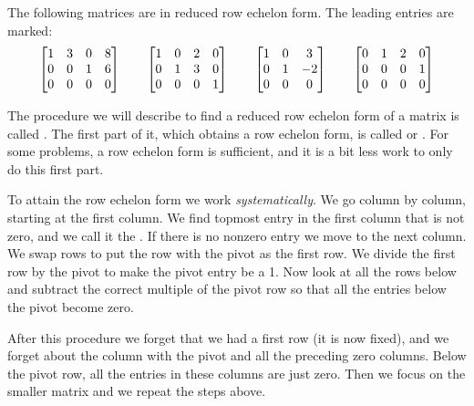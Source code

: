 \documentclass{ximera}
\begin{document}
\begin{example}
    The following matrices are in reduced row echelon form.  The leading entries are marked:
    \begin{equation*}
        \begin{bmatrix}
            1 & 3 & 0 & 8 \\
            0 & 0 & 1 & 6 \\
            0 & 0 & 0 & 0
        \end{bmatrix}
        \qquad
        \begin{bmatrix}
            1 & 0 & 2 &  0  \\
            0 & 1 & 3 & 0  \\
            0 & 0 & 0 & 1
        \end{bmatrix}
        \qquad
        \begin{bmatrix}
            1 & 0 & 3 \\
            0 & 1 & -2 \\
            0 & 0 & 0
        \end{bmatrix}
        \qquad
        \begin{bmatrix}
            0 & 1 & 2 & 0 \\
            0 & 0 & 0 & 1 \\
            0 & 0 & 0 & 0
        \end{bmatrix}
    \end{equation*}
\end{example}

The procedure we will describe to find a reduced row echelon form of a matrix is called \emph{}. The first part of it, which obtains a row echelon form, is called  \emph{} or \emph{}.  For some problems, a row echelon form is sufficient, and it is a bit less work to only do this first part.

To attain the row echelon form we work \emph{systematically}. We go column by column, starting at the first column.  We find topmost entry in the first column that is not zero, and we call it the \emph{}.  If there is no nonzero entry we move to the next column.  We swap rows to put the row with the pivot as the first row.  We divide the first row by the pivot to make the pivot entry be a 1.  Now look at all the rows below and subtract the correct multiple of the pivot row so that all the entries below the pivot become zero.

After this procedure we forget that we had a first row (it is now fixed), and we forget about the column with the pivot and all the preceding zero columns. Below the pivot row, all the entries in these columns are just zero.  Then we focus on the smaller matrix and we repeat the steps above.
\end{document}
